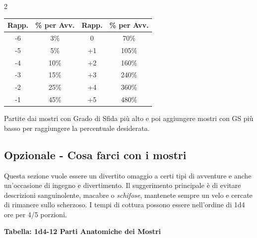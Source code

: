 \begin{multicols}{2}
\begin{enumerate}[leftmargin=*]
\noindent\begin{tabularx}{\linewidth}{c|c|c|c}
	\toprule
\rowcolor{gray!20}\textbf{Rapp.} & \textbf{\% per Avv.} &\textbf{Rapp.} & \textbf{\% per Avv.}\\
\toprule
-6 & 3\% &  0 & 70\% \\
\rowcolor{gray!20}-5 & 5\% & +1 & 105\% \\
-4 & 10\% & +2 & 160\% \\
\rowcolor{gray!20}-3 & 15\% & +3 & 240\% \\
-2 & 25\% & +4 & 360\% \\
\rowcolor{gray!20}-1 & 45\% & +5 & 480\% \\
\end{tabularx}

\medskip

Partite dai mostri con Grado di Sfida più alto e poi aggiungere mostri con GS più basso per raggiungere la percentuale desiderata.

\end{enumerate}


\subsection{Opzionale - Cosa farci con i mostri}

Questa sezione vuole essere un divertito omaggio a certi tipi di avventure e anche un'occasione di ingegno e divertimento. Il suggerimento principale è di evitare descrizioni sanguinolente, macabre o \emph{schifose}, mantenete sempre un velo e cercate di rimanere sullo scherzoso. I tempi di cottura possono essere nell'ordine di 1d4 ore per 4/5 porzioni.

\smallskip

\textbf{Tabella: 1d4-12 Parti Anatomiche dei Mostri}

\smallskip


\end{multicols}
